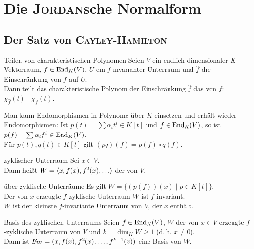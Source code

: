 \chapter{%
    Die \textsc{Jordan}sche Normalform%
}

\section{%
    Der Satz von \textsc{Cayley}-\textsc{Hamilton}%
}

\begin{Satz}{Teilen von charakteristischen Polynomen}
    Seien $V$ ein endlich-dimensionaler $K$-Vektorraum, $f \in \operatorname{End}_K(V)$,
    $U$ ein $f$-invarianter Unterraum und $\widehat{f}$ die Einschränkung
    von $f$ auf $U$. \\
    Dann teilt das charakteristische Polynom der Einschränkung $\widehat{f}$
    das von $f$:
    $\chi_{\widehat{f}}(t) \;|\; \chi_f(t)$.
\end{Satz}

\begin{Bem}
    Man kann Endomorphismen in Polynome über $K$ einsetzen und erhält
    wieder Endomorphismen:
    Ist $p(t) = \sum \alpha_i t^i \in K[t]$ und $f \in \operatorname{End}_K(V)$,
    so ist $p(f) = \sum \alpha_i f^i \in \operatorname{End}_K(V)$. \\
    Für $p(t), q(t) \in K[t]$ gilt $(pq)(f) = p(f) \circ q(f)$.
\end{Bem}

\begin{Def}{zyklischer Unterraum}
    Sei $x \in V$. \\
    Dann heißt $W = \aufspann{x, f(x), f^2(x), \dotsc}$
    der  von $V$.
\end{Def}

\begin{Lemma}{über zyklische Unterräume}
    Es gilt $W = \{(p(f))(x) \;|\; p \in K[t]\}$. \\
    Der von $x$ erzeugte $f$-zyklische Unterraum $W$ ist $f$-invariant. \\
    $W$ ist der kleinste $f$-invariante Unterraum von $V$, der $x$ enthält.
\end{Lemma}

\begin{Satz}{Basis des zyklischen Unterraums}
    Seien $f \in \operatorname{End}_K(V)$, $W$ der von $x \in V$ erzeugte $f$-zyklische
    Unterraum von $V$ und $k = \dim_K W \ge 1$ (d.\,h. $x \not= 0$). \\
    Dann ist $\mathcal{B}_W = (x, f(x), f^2(x), \dotsc, f^{k-1}(x))$ eine
    Basis von $W$.
\end{Satz}

